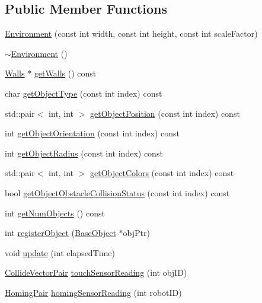 \subsection*{Public Member Functions}
\begin{DoxyCompactItemize}
\item 
\hyperlink{classEnvironment_a005e7ffe869ab060891880d058407ae0}{Environment} (const int width, const int height, const int scale\-Factor)
\item 
\hyperlink{classEnvironment_a8e294735187880dd3d59be10c425b29d}{$\sim$\-Environment} ()
\item 
\hyperlink{classWalls}{Walls} $\ast$ \hyperlink{classEnvironment_aeb10b316d1a388fa633613d5a7c1c095}{get\-Walls} () const 
\item 
char \hyperlink{classEnvironment_a40f36635e3a08093bfc7c13dae1ab802}{get\-Object\-Type} (const int index) const 
\item 
std\-::pair$<$ int, int $>$ \hyperlink{classEnvironment_a21de28a8d647dd3dfa097faaa76266c8}{get\-Object\-Position} (const int index) const 
\item 
int \hyperlink{classEnvironment_a57407c2a4127023ab3e3e8631d742b45}{get\-Object\-Orientation} (const int index) const 
\item 
int \hyperlink{classEnvironment_ab09800efb10e10230b8f49dbea0c4019}{get\-Object\-Radius} (const int index) const 
\item 
std\-::pair$<$ int, int $>$ \hyperlink{classEnvironment_ad233a196b5e2d3d9a21194011d135335}{get\-Object\-Colors} (const int index) const 
\item 
bool \hyperlink{classEnvironment_a3bae68ad481d5c6da8846ffed6ec08fc}{get\-Object\-Obstacle\-Collision\-Status} (const int index) const 
\item 
int \hyperlink{classEnvironment_a9808cd4199ace6e21de16b2e37ed4212}{get\-Num\-Objects} () const 
\item 
int \hyperlink{classEnvironment_ac5ad865f384d0c4656a76c8e44f77441}{register\-Object} (\hyperlink{classBaseObject}{Base\-Object} $\ast$obj\-Ptr)
\item 
void \hyperlink{classEnvironment_a25ab88a722c206c100eba3a5788d88c4}{update} (int elapsed\-Time)
\item 
\hyperlink{classEnvironment_a9609fedf5c7244c3515c8e5640b81e85}{Collide\-Vector\-Pair} \hyperlink{classEnvironment_acd2595742e8d30962d90d6871a184ba6}{touch\-Sensor\-Reading} (int obj\-I\-D)
\item 
\hyperlink{classEnvironment_aa0cae1577b893c94479b544518c11d3b}{Homing\-Pair} \hyperlink{classEnvironment_a681b85535a9a7dbc2b594d28d6c61e81}{homing\-Sensor\-Reading} (int robot\-I\-D)
\end{DoxyCompactItemize}


